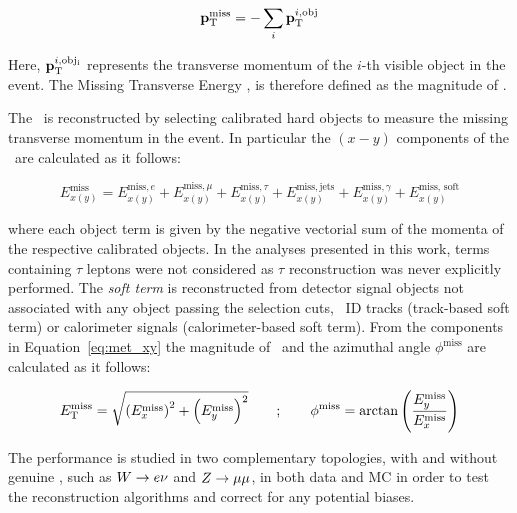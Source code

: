 			\begin{equation}
				\mathbf{p}_\mathrm{T}^\mathrm{miss} = - \sum_i \mathbf{p}_\mathrm{T}^{i, \mathrm{obj}}
				\label{eq:ptmiss}
			\end{equation}

			\noindent Here, $\mathbf{p}_\mathrm{T}^{i, \mathrm{obj_i}}$ represents the transverse momentum of the $i$-th visible object in the event. The Missing Transverse Energy \met, is therefore defined as the magnitude of \ptmiss. 

			The \met\ is reconstructed by selecting calibrated hard objects to measure the missing transverse momentum in the event. In particular the $(x-y)$ components of the \met\ are calculated as it follows: 

			\begin{equation}
				E_{x(y)}^{\mathrm{miss}} = E_{x(y)}^{\mathrm{miss}, e} + E_{x(y)}^{\mathrm{miss}, \mu} + E_{x(y)}^{\mathrm{miss}, \tau} + E_{x(y)}^{\mathrm{miss, jets}} + E_{x(y)}^{\mathrm{miss}, \gamma} + E_{x(y)}^{\mathrm{miss,\,soft}}
				\label{eq:met_xy}
			\end{equation}

			where each object term is given by the negative vectorial sum of the momenta of the respective calibrated objects. In the analyses presented in this work, terms containing $\tau$ leptons were not considered as $\tau$ reconstruction was never explicitly performed. The \emph{soft term} is reconstructed from detector signal objects not associated with any object passing the selection cuts, \eg\ \ac{ID} tracks (track-based soft term) or calorimeter signals (calorimeter-based soft term). From the components in Equation~\ref{eq:met_xy} the magnitude of \met\ and the azimuthal angle $\phi^{\mathrm{miss}}$ are calculated as it follows:

			\begin{eqnarray}
				E_{\mathrm{T}}^{\mathrm{miss}} = \sqrt{ \left(E_{x}^{\mathrm{miss}}\right)^2 + \left(E_{y}^{\mathrm{miss}} \right)^2 } \qquad ; \qquad
				\phi^{\mathrm{miss}} = \arctan \left ( \frac{E_y^{\mathrm{miss}}}{E_x^{\mathrm{miss}}} \right )
			\end{eqnarray}

			The \met performance is studied in two complementary topologies, with and without genuine \met, such as $W \rightarrow e\nu$ and $Z \rightarrow \mu\mu$, in both data and \ac{MC} in order to test the reconstruction algorithms and correct for any potential biases. 